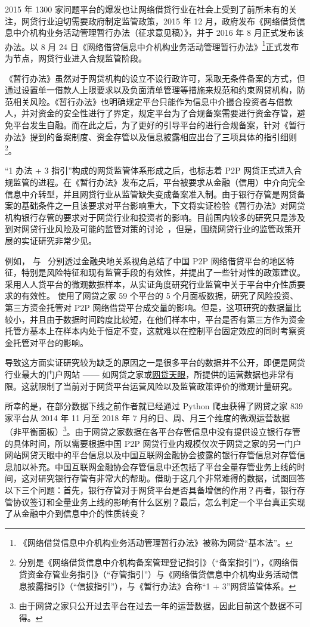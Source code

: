 \documentclass[lang=cn,11pt,authoryear]{elegantpaper}
\begin{document}
2015 年 1300 家问题平台的爆发也让网络借贷行业在社会上受到了前所未有的关注，网贷行业迫切需要政府制定监管政策，2015 年 12 月，政府发布《网络借贷信息中介机构业务活动管理暂行办法（征求意见稿）》，并于 2016 年 8 月正式发布该办法。以 8 月 24 日《网络借贷信息中介机构业务活动管理暂行办法》\footnote{《网络借贷信息中介机构业务活动管理暂行办法》被称为网贷“基本法”。}正式发布为节点，网贷行业进入合规监管阶段。

《暂行办法》虽然对于网贷机构的设立不设行政许可，采取无条件备案的方式，但通过设置单一借款人上限要求以及负面清单管理等措施来规范和约束网贷机构，防范相关风险。《暂行办法》也明确规定平台只能作为信息中介撮合投资者与借款人，并对资金的安全性进行了界定，规定平台为了合规备案需要进行资金存管，避免平台发生自融。而在此之后，为了更好的引导平台的进行合规备案，针对《暂行办法》提到的备案制度、资金存管以及信息披露相应出台了三项具体的指引细则\footnote{ 分别是《网络借贷信息中介机构备案管理登记指引》（“备案指引”），《网络借贷资金存管业务指引》（“存管指引”）与《网络借贷信息中介机构业务活动信息披露指引》（“信披指引”），与《暂行办法》合称“1 + 3”网贷监管体系。}。

“1 办法 + 3 指引”构成的网贷监管体系形成之后，也标志着 P2P 网贷正式进入合规监管的进程。在《暂行办法》发布之后，平台被要求从金融（信用）中介向完全信息中介转型，并且网贷行业从监管缺失变成备案准入制。由于银行存管是网贷备案的基础条件之一且该要求对平台影响重大，下文将实证检验《暂行办法》对网贷机构银行存管的要求对于网贷行业和投资者的影响。目前国内较多的研究只是涉及到对网贷行业风险及可能的监管对策的讨论~\citep{lsq2014,wj2015,awhxmy2016}，但是，围绕网贷行业的监管政策开展的实证研究非常少见。

例如，\cite{gf2016a} 与~\cite{tym2017} 分别透过金融央地关系视角总结了中国 P2P 网络借贷平台的地区特征，特别是风险特征和现有监管手段的有效性，并提出了一些针对性的政策建议。\cite{xsypylwyq2018} 采用人人贷平台的微观数据样本，从实证角度研究行业监管中关于平台中介性质要求的有效性。\cite{lsxlh2015} 使用了网贷之家 59 个平台的 5 个月面板数据，研究了风险投资、第三方资金托管对 P2P 网络借贷平台成交量的影响。但是，这项研究的数据量比较小，并且由于数据时间跨度比较短，在他们样本中，平台是否有第三方作为资金托管方基本上在样本内处于恒定不变，这就难以在控制平台固定效应的同时考察资金托管对平台的影响。

导致这方面实证研究较为缺乏的原因之一是很多平台的数据并不公开，即便是网贷行业最大的门户网站 —— 如网贷之家或\href{https://www.p2peye.com/}{网贷天眼}，所提供的运营数据也非常有限。这就限制了当前对于网贷平台运营风险以及监管政策评价的微观计量研究。

所幸的是，在部分数据下线之前作者就已经通过 Python 爬虫获得了网贷之家 839 家平台从 2014 年 11 月至 2018 年 7 月的日、周、月三个维度的微观运营数据（非平衡面板）\footnote{由于网贷之家只公开过去平台在过去一年的运营数据，因此目前这个数据不可得。}。由于网贷之家数据在各平台存管信息中没有提供设立银行存管的具体时间，所以需要根据中国 P2P 网贷行业内规模仅次于网贷之家的另一门户网站网贷天眼中的平台信息以及中国互联网金融协会披露的银行存管信息对存管信息加以补充。中国互联网金融协会存管信息中还包括了平台全量存管业务上线的时间，这对研究银行存管有非常大的帮助。借助于这几个非常难得的数据，试图回答以下三个问题：首先，银行存管对于网贷平台是否具备增信的作用？再者，银行存管协议签订和全量业务上线的影响有什么区别？最后，怎么判定一个平台真正实现了从金融中介到信息中介的性质转变？
\end{document}
